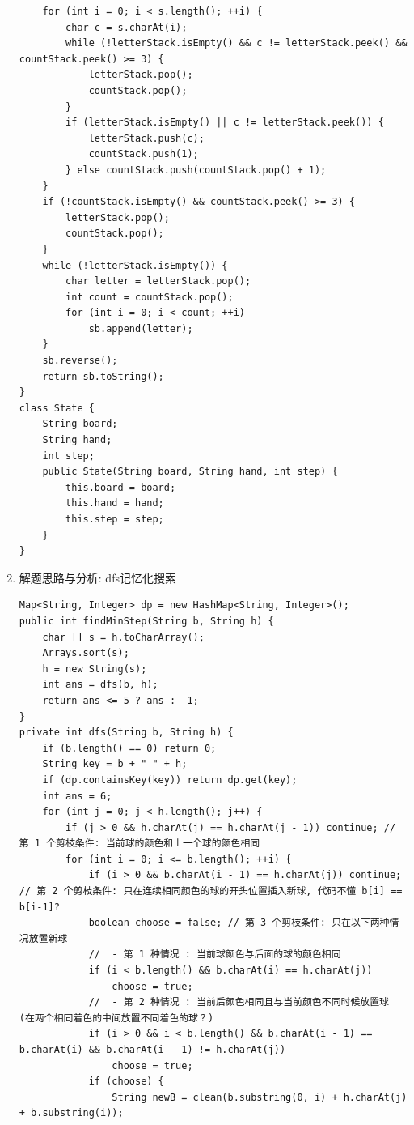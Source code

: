 \documentclass[9pt, b5paaper]{book}
\begin{document}
\begin{enumerate}
\begin{verbatim}
    for (int i = 0; i < s.length(); ++i) {
        char c = s.charAt(i);
        while (!letterStack.isEmpty() && c != letterStack.peek() && countStack.peek() >= 3) {
            letterStack.pop();
            countStack.pop();
        }
        if (letterStack.isEmpty() || c != letterStack.peek()) {
            letterStack.push(c);
            countStack.push(1);
        } else countStack.push(countStack.pop() + 1);
    }
    if (!countStack.isEmpty() && countStack.peek() >= 3) {
        letterStack.pop();
        countStack.pop();
    }
    while (!letterStack.isEmpty()) {
        char letter = letterStack.pop();
        int count = countStack.pop();
        for (int i = 0; i < count; ++i) 
            sb.append(letter);
    }
    sb.reverse();
    return sb.toString();
}
class State {
    String board;
    String hand;
    int step;
    public State(String board, String hand, int step) {
        this.board = board;
        this.hand = hand;
        this.step = step;
    }
}
\end{verbatim}
\item 解题思路与分析: dfs记忆化搜索
\label{sec-1-0-9-2}
\begin{verbatim}
Map<String, Integer> dp = new HashMap<String, Integer>();
public int findMinStep(String b, String h) {
    char [] s = h.toCharArray();
    Arrays.sort(s);
    h = new String(s);
    int ans = dfs(b, h);
    return ans <= 5 ? ans : -1;
}
private int dfs(String b, String h) {
    if (b.length() == 0) return 0;
    String key = b + "_" + h;
    if (dp.containsKey(key)) return dp.get(key);
    int ans = 6;
    for (int j = 0; j < h.length(); j++) {
        if (j > 0 && h.charAt(j) == h.charAt(j - 1)) continue; // 第 1 个剪枝条件: 当前球的颜色和上一个球的颜色相同
        for (int i = 0; i <= b.length(); ++i) {
            if (i > 0 && b.charAt(i - 1) == h.charAt(j)) continue; // 第 2 个剪枝条件: 只在连续相同颜色的球的开头位置插入新球, 代码不懂 b[i] == b[i-1]?
            boolean choose = false; // 第 3 个剪枝条件: 只在以下两种情况放置新球
            //  - 第 1 种情况 : 当前球颜色与后面的球的颜色相同
            if (i < b.length() && b.charAt(i) == h.charAt(j)) 
                choose = true;
            //  - 第 2 种情况 : 当前后颜色相同且与当前颜色不同时候放置球 (在两个相同着色的中间放置不同着色的球？)
            if (i > 0 && i < b.length() && b.charAt(i - 1) == b.charAt(i) && b.charAt(i - 1) != h.charAt(j)) 
                choose = true;
            if (choose) {
                String newB = clean(b.substring(0, i) + h.charAt(j) + b.substring(i));

\end{verbatim}
\end{enumerate}
\end{document}
